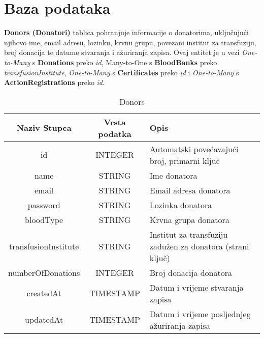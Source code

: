\documentclass[12pt]{article}
\begin{document}
\section{Baza podataka}

\noindent\textbf{Donors (Donatori)} tablica pohranjuje informacije o donatorima, uključujući njihovo ime, email adresu, lozinku, krvnu grupu, povezani institut za transfuziju, broj donacija te datume stvaranja i ažuriranja zapisa. Ovaj entitet je u vezi \textit{One-to-Many} s \textbf{Donations} preko \textit{id},  {Many-to-One} s \textbf{BloodBanks} preko \textit{transfusionInstitute}, \textit{One-to-Many} s \textbf{Certificates} preko \textit{id} i \textit{One-to-Many} s \textbf{ActionRegistrations} preko \textit{id}.
\begin{table}[H]
    \renewcommand{\arraystretch}{2}
    \centering
     \begin{tabularx}{1\textwidth}{|c|c|X|}
    \hline
    \textbf{Naziv Stupca} & \textbf{Vrsta podatka} & \textbf{Opis} \\
    \hline
    id & INTEGER & Automatski povećavajući broj, primarni ključ\\
    \hline
    name & STRING & Ime donatora \\
    \hline
    email & STRING & Email adresa donatora \\
    \hline
    password & STRING & Lozinka donatora \\
    \hline
    bloodType & STRING & Krvna grupa donatora \\
    \hline
    transfusionInstitute & STRING & Institut za transfuziju zadužen za donatora (strani ključ)\\
    \hline
    numberOfDonations & INTEGER & Broj donacija donatora \\
    \hline
    createdAt & TIMESTAMP & Datum i vrijeme stvaranja zapisa \\
    \hline
    updatedAt & TIMESTAMP & Datum i vrijeme posljednjeg ažuriranja zapisa \\
    \hline
    \end{tabularx}
    \caption{Donors}
    \label{tab:my_label}
\end{table}
\clearpage %
\end{document}
